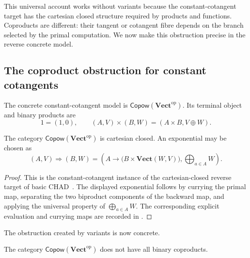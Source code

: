 \documentclass[runningheads,envcountsame]{llncs}
\newcommand{\Vect}{\mathbf{Vect}}
\newcommand{\Vectop}{\mathbf{Vect}^{\mathrm{op}}}
\newcommand{\Copow}{\mathsf{Copow}}
\begin{document}
This universal account works without variants because the constant-cotangent target has the cartesian closed structure required by products and functions. Coproducts are different: their tangent or cotangent fibre depends on the branch selected by the primal computation. We now make this obstruction precise in the reverse concrete model.

\subsection{The coproduct obstruction for constant cotangents}

The concrete constant-cotangent model is $\Copow(\Vectop)$. Its terminal object and binary products are
$$
1=(1,0),
\qquad
(A,V)\times(B,W)=(A\times B,V\oplus W).
$$

\begin{proposition}
\label{prop:ccc}
The category $\Copow(\Vectop)$ is cartesian closed. An exponential may be chosen as
$$
(A,V)\Rightarrow(B,W)
=
\left(
A\to\bigl(B\times\Vect(W,V)\bigr),
\bigoplus_{a\in A}W
\right).
$$
\end{proposition}

\begin{proof}
This is the constant-cotangent instance of the cartesian-closed reverse target of basic CHAD~\cite{Vakar2021,VakarSmeding2022}. The displayed exponential follows by currying the primal map, separating the two biproduct components of the backward map, and applying the universal property of $\bigoplus_{a\in A}W$. The corresponding explicit evaluation and currying maps are recorded in .
\end{proof}

The obstruction created by variants is now concrete.

\begin{proposition}
	\label{prop:obstruction}
	The category $\Copow(\Vectop)$ does not have all binary coproducts.
\end{proposition}
\end{document}
